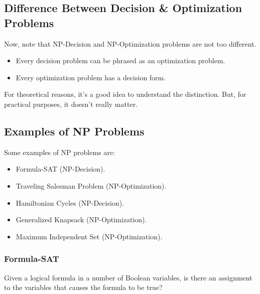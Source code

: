 \documentclass[letterpaper]{article}
\begin{document}
\subsection{Difference Between Decision \& Optimization Problems}
Now, note that NP-Decision and NP-Optimization problems are not too different. 
\begin{itemize}
    \item Every decision problem can be phrased as an optimization problem.
    \item Every optimization problem has a decision form.
\end{itemize}
For theoretical reasons, it's a good idea to understand the distinction. But, for practical purposes, it doesn't really matter. 

\subsection{Examples of NP Problems}
Some examples of NP problems are: 
\begin{itemize}
    \item Formula-SAT (NP-Decision). 
    \item Traveling Salesman Problem (NP-Optimization). 
    \item Hamiltonian Cycles (NP-Decision). 
    \item Generalized Knapsack (NP-Optimization). 
    \item Maximum Independent Set (NP-Optimization). 
\end{itemize}

\subsubsection{Formula-SAT}
Given a logical formula in a number of Boolean variables, is there an assignment to the variables that causes the formula to be true? 

\bigskip
\end{document}
